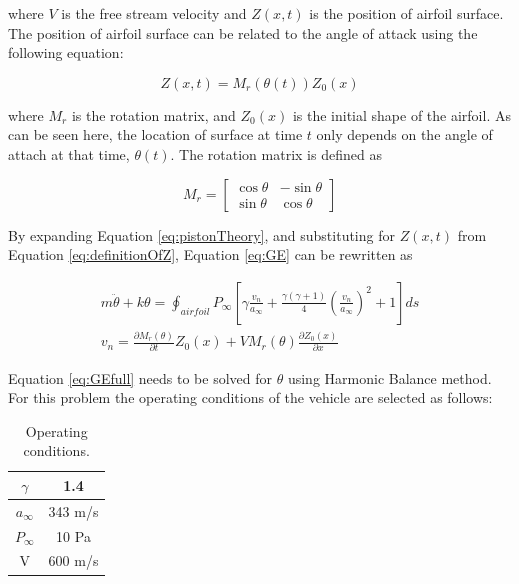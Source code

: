 \documentclass[12pt, a4paper]{extarticle}
\begin{document}
where $V$ is the free stream velocity and $Z(x,t)$ is the position of airfoil surface. The position of airfoil surface can be related to the angle of attack using the following equation:

\begin{equation}\label{eq:definitionOfZ}
	Z(x,t) = M_r\left( \theta(t) \right) Z_0(x)
\end{equation}

where $M_r$ is the rotation matrix, and $Z_0(x)$ is the initial shape of the airfoil.  As can be seen here, the location of surface at time $t$ only depends on the angle of attach at that time, $\theta(t)$. The rotation matrix is defined as

\begin{equation*}
	M_r = 
	\begin{bmatrix}
		\cos \theta & -\sin \theta \\
		\sin \theta & \cos \theta
	\end{bmatrix}
\end{equation*}

By expanding Equation \eqref{eq:pistonTheory}, and substituting for $Z(x,t)$ from Equation \eqref{eq:definitionOfZ}, Equation \eqref{eq:GE} can be rewritten as

\begin{subequations}
\begin{gather}
	m\ddot{\theta} + k \theta = 
	\oint_{airfoil} P_\infty
	\left[
	\gamma \frac{v_n}{a_\infty} +
	\frac{\gamma (\gamma + 1)}{4} \left( \frac{v_n}{a_\infty}\right)^2 +
	1
	\right] ds
	\\
	v_n = 
	\frac{\partial M_r(\theta)}{\partial t}Z_0(x) + V M_r(\theta)\frac{\partial Z_0(x)}{\partial x}
\end{gather}\label{eq:GEfull}
\end{subequations}

Equation \eqref{eq:GEfull} needs to be solved for $\theta$ using Harmonic Balance method. For this problem the operating conditions of the vehicle are selected as follows:

\begin{table}[htbp]
\begin{center}
\begin{tabular}{c|c}
	$\gamma$ & 1.4 \\ \hline
	$a_\infty$ & 343 m/s \\ \hline
	$P_\infty$ & 10 Pa \\ \hline
	V & 600 m/s \\
	\end{tabular}
	\end{center}
	\caption{Operating conditions.}
\end{table}
\end{document}
